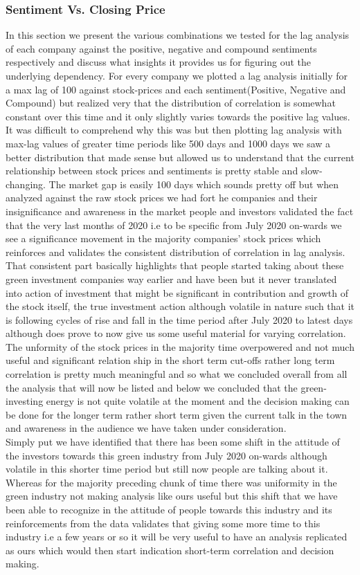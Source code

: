 \documentclass[sigconf, nonacm]{acmart}
\begin{document}
\subsubsection{Sentiment Vs. Closing Price}
In this section we present the various combinations we tested for the lag analysis of each company against the positive, negative and compound sentiments respectively and discuss what insights it provides us for figuring out the underlying dependency. For every company we plotted a lag analysis initially for a max lag of 100 against stock-prices and each sentiment(Positive, Negative and Compound) but realized very that the distribution of correlation is somewhat constant over this time and it only slightly varies towards the positive lag values. It was difficult to comprehend why this was but then plotting lag analysis with max-lag values of greater time periods like 500 days and 1000 days we saw a better distribution that made sense but allowed us to understand that the current relationship between stock prices and sentiments is pretty stable and slow-changing. The market gap is easily 100 days which sounds pretty off but when analyzed against the raw stock prices we had fort he companies and their insignificance and awareness in the market people and investors validated the fact that the very last months of 2020 i.e to be specific from July 2020 on-wards we see a significance movement in the majority companies' stock prices which reinforces and validates the consistent distribution of correlation in lag analysis. That consistent part basically highlights that people started taking about these green investment companies way earlier and have been but it never translated into action of investment that might be significant in contribution and growth of the stock itself, the true investment action although volatile in nature such that it is following cycles of rise and fall in the time period after July 2020 to latest days although does prove to now give us some useful material for varying correlation. The unformity of the stock prices in the majority time overpowered and not much useful and significant relation ship in the short term cut-offs rather long term correlation is pretty much meaningful and so what we concluded overall from all the analysis that will now be listed and below we concluded that the green-investing energy is not quite volatile at the moment and the decision making can be done for the longer term rather short term given the current talk in the town and awareness in the audience we have taken under consideration. 
\\Simply put we have identified that there has been some shift in the attitude of the investors towards this green industry from July 2020 on-wards although volatile in this shorter time period but still now people are talking about it. Whereas for the majority preceding chunk of time there was uniformity in the green industry not making analysis like ours useful but this shift that we have been able to recognize in the attitude of people towards this industry and its reinforcements from the data validates that giving some more time to this industry i.e a few years or so it will be very useful to have an analysis replicated as ours which would then start indication short-term correlation and decision making. 
\end{document}
